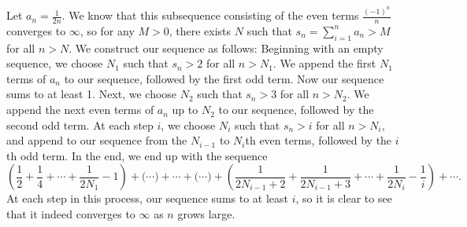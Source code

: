 \documentclass[11pt]{article}
\begin{document}
\section{} %
Let $a_n=\frac{1}{2n}$.
We know that this subsequence consisting of the even terms $\frac{(-1)^n}{n}$ converges to $\infty$, so for any $M>0$, there exists $N$ such that $s_n=\sum_{i=1}^na_n>M$ for all $n>N$.
We construct our sequence as follows:
\newline
\newline
Beginning with an empty sequence, we choose $N_1$ such that $s_n>2$ for all $n>N_1$.
We append the first $N_1$ terms of $a_n$ to our sequence, followed by the first odd term.
Now our sequence sums to at least 1.
\newline
\newline
Next, we choose $N_2$ such that $s_n>3$ for all $n>N_2$.
We append the next even terms of $a_n$ up to $N_2$ to our sequence, followed by the second odd term.
\newline
\newline
At each step $i$, we choose $N_i$ such that $s_n>i$ for all $n>N_i$, and append to our sequence from the $N_{i-1}$ to $N_i$th even terms, followed by the $i$th odd term.
In the end, we end up with the sequence
\[\left(\frac{1}{2}+\frac{1}{4}+\cdots+\frac{1}{2N_1}-1\right)+\Big(\cdots\Big)+\cdots+\Big(\cdots\Big)+\left(\frac{1}{2N_{i-1}+2}+\frac{1}{2N_{i-1}+3}+\cdots+\frac{1}{2N_i}-\frac{1}{i}\right)+\cdots.\]
At each step in this process, our sequence sums to at least $i$, so it is clear to see that it indeed converges to $\infty$ as $n$ grows large.


\section{} %
\end{document}
